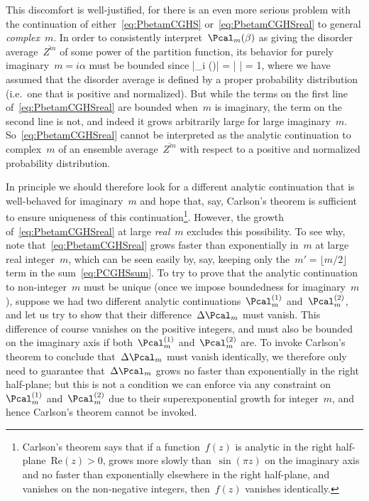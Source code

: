 \documentclass[12pt]{article}
\begin{document}
This discomfort is well-justified, for there is an even more serious problem with the continuation of either~\eqref{eq:PbetamCGHS} or~\eqref{eq:PbetamCGHSreal} to general \textit{complex}~$m$.  In order to consistently interpret~$\Pcal_m(\beta)$ as giving the disorder average~$\overline{Z^m}$ of some power of the partition function, its behavior for purely imaginary~$m = i\alpha$ must be bounded since
\be
\left|\Pcal_{i\alpha} (\beta)\right| = \left|  \right| \leq {} = 1,
\ee
where we have assumed that the disorder average is defined by a proper probability distribution (i.e.~one that is positive and normalized).  But while the terms on the first line of~\eqref{eq:PbetamCGHSreal} are bounded when~$m$ is imaginary, the term on the second line is not, and indeed it grows arbitrarily large for large imaginary~$m$.  So~\eqref{eq:PbetamCGHSreal} cannot be interpreted as the analytic continuation to complex~$m$ of an ensemble average~$\overline{Z^m}$ with respect to a positive and normalized probability distribution.

In principle we should therefore look for a different analytic continuation that is well-behaved for imaginary~$m$ and hope that, say, Carlson's theorem is sufficient to ensure uniqueness of this continuation\footnote{Carlson's theorem says that if a function~$f(z)$ is analytic in the right half-plane~$\mathrm{Re}(z) > 0$, grows more slowly than~$\sin(\pi z)$ on the imaginary axis and no faster than exponentially elsewhere in the right half-plane, and vanishes on the non-negative integers, then~$f(z)$ vanishes identically.}.  However, the growth of~\eqref{eq:PbetamCGHSreal} at large \textit{real}~$m$ excludes this possibility.  To see why, note that~\eqref{eq:PbetamCGHSreal} grows faster than exponentially in~$m$ at large real integer~$m$, which can be seen easily by, say, keeping only the~$m' = \lfloor m/2 \rfloor$ term in the sum~\eqref{eq:PCGHSsum}.  To try to prove that the analytic continuation to non-integer~$m$ must be unique (once we impose boundedness for imaginary~$m$), suppose we had two different analytic continuations~$\Pcal_m^{(1)}$ and~$\Pcal_m^{(2)}$, and let us try to show that their difference~$\Delta \Pcal_m$ must vanish.  This difference of course vanishes on the positive integers, and must also be bounded on the imaginary axis if both~$\Pcal_m^{(1)}$ and~$\Pcal_m^{(2)}$ are.  To invoke Carlson's theorem to conclude that~$\Delta \Pcal_m$ must vanish identically, we therefore only need to guarantee that~$\Delta \Pcal_m$ grows no faster than exponentially in the right half-plane; but this is not a condition we can enforce via any constraint on~$\Pcal_m^{(1)}$ and~$\Pcal_m^{(2)}$ due to their superexponential growth for integer~$m$, and hence Carlson's theorem cannot be invoked.
\end{document}
